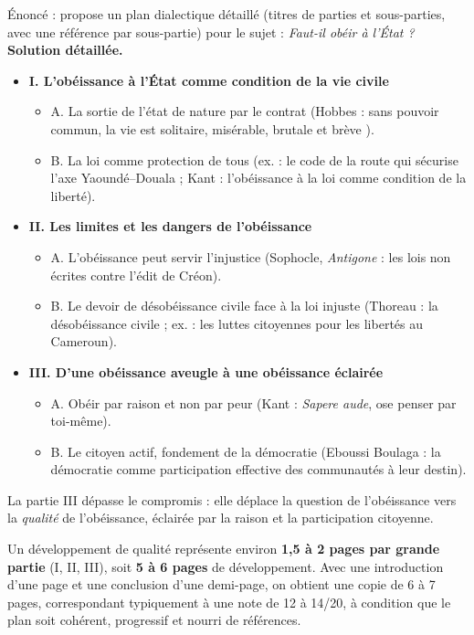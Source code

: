 \documentclass[11pt]{article}
\begin{document}
\begin{exoresolu}
Énoncé : propose un plan dialectique détaillé (titres de parties et sous-parties, avec une référence par sous-partie) pour le sujet : \emph{Faut-il obéir à l'État ?}
\tcblower
\textbf{Solution détaillée.}
\begin{itemize}
\item \textbf{I. L'obéissance à l'État comme condition de la vie civile}
\begin{itemize}
\item A. La sortie de l'état de nature par le contrat (Hobbes : sans pouvoir commun, la vie est \og solitaire, misérable, brutale et brève \fg{}).
\item B. La loi comme protection de tous (ex. : le code de la route qui sécurise l'axe Yaoundé--Douala ; Kant : l'obéissance à la loi comme condition de la liberté).
\end{itemize}
\item \textbf{II. Les limites et les dangers de l'obéissance}
\begin{itemize}
\item A. L'obéissance peut servir l'injustice (Sophocle, \emph{Antigone} : les lois non écrites contre l'édit de Créon).
\item B. Le devoir de désobéissance civile face à la loi injuste (Thoreau : la désobéissance civile ; ex. : les luttes citoyennes pour les libertés au Cameroun).
\end{itemize}
\item \textbf{III. D'une obéissance aveugle à une obéissance éclairée}
\begin{itemize}
\item A. Obéir par raison et non par peur (Kant : \emph{Sapere aude}, ose penser par toi-même).
\item B. Le citoyen actif, fondement de la démocratie (Eboussi Boulaga : la démocratie comme participation effective des communautés à leur destin).
\end{itemize}
\end{itemize}
La partie III dépasse le compromis : elle déplace la question de l'obéissance vers la \emph{qualité} de l'obéissance, éclairée par la raison et la participation citoyenne.
\end{exoresolu}

\begin{exemplebox}
Un développement de qualité représente environ \textbf{1,5 à 2 pages par grande partie} (I, II, III), soit \textbf{5 à 6 pages} de développement. Avec une introduction d'une page et une conclusion d'une demi-page, on obtient une copie de 6 à 7 pages, correspondant typiquement à une note de 12 à 14/20, à condition que le plan soit cohérent, progressif et nourri de références.
\end{exemplebox}
\end{document}

